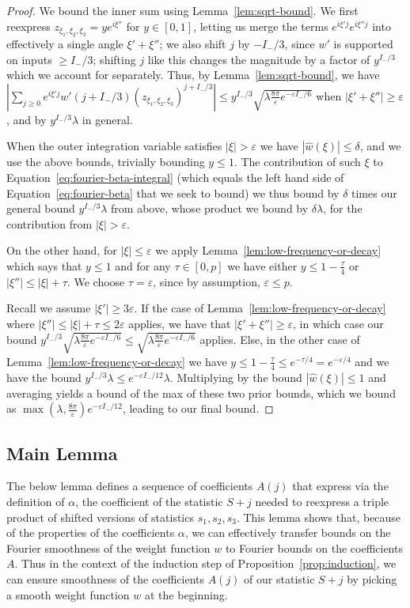 \documentclass[11pt]{article}
\theoremstyle{plain}
\newcommand{\eps}{\varepsilon}
\begin{document}
\begin{proof}
We bound the inner sum using Lemma~\ref{lem:sqrt-bound}. We first reexpress $z_{\xi_1,\xi_2,\xi_3}=y e^{i \xi''}$ for $y\in[0,1]$, letting us merge the terms $e^{i\xi'j}e^{i\xi'' j}$ into effectively a single angle $\xi'+\xi''$; we also shift $j$ by $-I_-/3$, since $w'$ is supported on inputs $\geq I_-/3$; shifting $j$ like this changes the magnitude by a factor of $y^{I_-/3}$ which we account for separately. Thus, by Lemma~\ref{lem:sqrt-bound}, we have $|\sum_{j\geq 0} e^{i\xi'j} w'(j+I_-/3)(z_{\xi_1,\xi_2,\xi_3})^{j+I_-/3}|\leq y^{I_-/3} \sqrt{\lambda\frac{8\pi}{\eps}e^{-\eps I_-/6}}$ when $|\xi'+\xi''|\geq\eps$, and by $y^{I_-/3}\lambda$ in general.

When the outer integration variable satisfies $|\xi|> \eps$ we have $|\hat{w}(\xi)|\leq \delta$, and we use the above bounds, trivially bounding $y\leq 1$. The contribution of such $\xi$ to Equation~\ref{eq:fourier-beta-integral} (which equals the left hand side of Equation~\ref{eq:fourier-beta} that we seek to bound) we thus bound by $\delta$ times our general bound $y^{I_-/3}\lambda$ from above, whose product we bound by $\delta \lambda$,
 for the contribution from 
$|\xi|> \eps$.

On the other hand, for $|\xi|\leq \eps$ we apply Lemma~\ref{lem:low-frequency-or-decay} which says that $y\leq 1$ and for any $\tau\in [0,p]$ we have either $y\leq 1-\frac{\tau}{4}$ or $|\xi''|\leq |\xi|+\tau$. We choose $\tau=\eps$, since by assumption, $\eps\leq p$.

Recall we assume $|\xi'|\geq 3\eps$. If the case of Lemma~\ref{lem:low-frequency-or-decay} where $|\xi''|\leq |\xi|+\tau\leq 2\eps$ applies, we have that $|\xi'+\xi''|\geq \eps$, in which case our bound $y^{I_-/3} \sqrt{\lambda\frac{8\pi}{\eps}e^{-\eps I_-/6}}\leq \sqrt{\lambda\frac{8\pi}{\eps}e^{-\eps I_-/6}}$ applies. Else, in the other case of Lemma~\ref{lem:low-frequency-or-decay} we have $y\leq 1-\frac{\tau}{4}\leq e^{-\tau/4}=e^{-\eps/4}$ and we have the bound $y^{I_-/3}\lambda\leq e^{-\eps I_-/12}\lambda$. Multiplying by the bound $|\hat{w}(\xi)|\leq 1$ and averaging yields a bound of the max of these two prior bounds, which we bound as $\max(\lambda,\frac{8\pi}{\eps})e^{-\eps I_-/12}$, leading to our final bound.
\end{proof}

\subsection{Main Lemma}
The below lemma defines a sequence of coefficients $A(j)$ that express via the definition of $\alpha$, the coefficient of the statistic $S+j$ needed to reexpress a triple product of shifted versions of statistics $s_1,s_2,s_3$.
This lemma shows that, because of the properties of the coefficients $\alpha$, we can effectively transfer bounds on the Fourier smoothness of the weight function $w$ to Fourier bounds on the coefficients $A$. Thus in the context of the induction step of Proposition~\ref{prop:induction}, we can ensure smoothness of the coefficients $A(j)$ of our statistic $S+j$ by picking a smooth weight function $w$ at the beginning.
\end{document}
